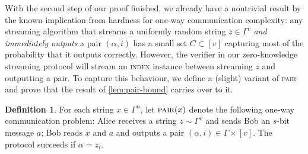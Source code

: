 \documentclass[a4paper,UKenglish,cleveref, autoref, thm-restate]{lipics-v2021}
\theoremstyle{definition}
\newtheorem{definition}[theorem]{Definition}
\newcommand{\indexproblem}{\normalfont\textsc{index}\xspace}
\newcommand{\pair}{\normalfont\textsc{pair}\xspace}
\newcommand{\vcommitlength}{v}
\newcommand{\vcommitstring}{z}
\newcommand{\alphabet}{\Gamma}
\begin{document}
With the second step of our proof finished, we already have a nontrivial result by the known implication from hardness for one-way communication complexity: any streaming algorithm that streams a uniformly random string $\vcommitstring \in \alphabet^\vcommitlength$ \emph{and immediately outputs} a pair $(\alpha, i)$ has a small set $C \subset [\vcommitlength]$ capturing most of the probability that it outputs correctly. However, the verifier in our zero-knowledge streaming protocol will stream an \indexproblem instance between streaming $\vcommitstring$ and outputting a pair. To capture this behaviour, we define a (slight) variant of \pair and prove that the result of \cref{lem:pair-bound} carries over to it.

\begin{definition}
    \label{def:pair-x}
    For each string $x \in \alphabet^n$, let $\pair(x)$ denote the following one-way communication problem: Alice receives a string $\vcommitstring \sim \alphabet^\vcommitlength$ and sends Bob an $s$-bit message $a$; Bob reads $x$ and $a$ and outputs a pair $(\alpha, i) \in \alphabet \times [\vcommitlength]$. The protocol succeeds if $\alpha = \vcommitstring_i$.
\end{definition}
\end{document}
